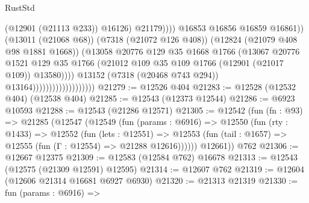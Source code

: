\begin{lexlean}{RustStd}
\begin{coremodule}
                                                          (@12901 (@21113 @233))
                                                          @16126)
                                                        @21179))))
                                                @16853
                                                @16856
                                                @16859
                                                @16861))
                                            (@13011 (@21068 @68))
                                            (@7318 (@21072 @126 @408))
                                            (@12824 (@21079 @408 @98 @1881 @1668))
                                            (@13058
                                              @20776
                                              @129
                                              @35
                                              @1668
                                              @1766
                                              (@13067
                                                @20776
                                                @1521
                                                @129
                                                @35
                                                @1766
                                                (@21012
                                                  @109
                                                  @35
                                                  @109
                                                  @1766
                                                  (@12901 (@21017 @109))
                                                  @13580))))
                                          @13152
                                          (@7318 (@20468 @743 @294))
                                          @13164)))))))))))))))))))
@21279 := @12526 @404
@21283 := @12528 (@12532 @404) (@12538 @404)
@21285 := @12543 (@12373 @12544)
@21286 := @6923 @10593
@21288 := @12543 (@21286 @12571)
@21305 := @12542
    (fun (fn : @93) =>
    @21285
      (@12547
        (@12549
          (fun (params : @6916) =>
          @12550
            (fun (rty : @1433) =>
            @12552
              (fun (lets : @12551) =>
              @12553 (fun (tail : @1657) => @12555 (fun (Γ : @12554) => @21288 @12616))))))
        @12661))
    @762
@21306 := @12667 @12375
@21309 := @12583 (@12584 @762) @16678
@21313 := @12543 (@12575 (@21309 @12591) @12595)
@21314 := @12607 @762
@21319 := @12604 (@12606 @21314 @16681 @6927 @6930)
@21320 := @21313 @21319
@21330 := fun (params : @6916) =>

\end{coremodule}
\end{lexlean}

